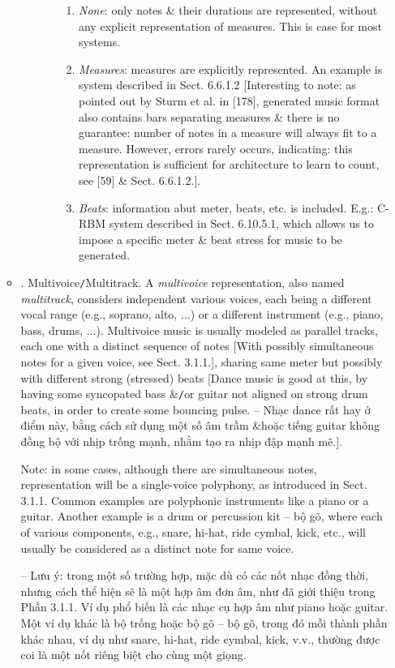 \documentclass{article}
\begin{document}
\begin{itemize}
\begin{itemize}
\begin{itemize}
\begin{itemize}
\begin{enumerate}
					\item {\it None}: only notes \& their durations are represented, without any explicit representation of measures. This is case for most systems.
					\item {\it Measures}: measures are explicitly represented. An example is system described in Sect. 6.6.1.2 [Interesting to note: as pointed out by Sturm et al. in [178], generated music format also contains bars separating measures \& there is no guarantee: number of notes in a measure will always fit to a measure. However, errors rarely occurs, indicating: this representation is sufficient for architecture to learn to count, see [59] \& Sect. 6.6.1.2.].
					\item {\it Beats}: information abut meter, beats, etc. is included. E.g.: C-RBM system described in Sect. 6.10.5.1, which allows us to impose a specific meter \& beat stress for music to be generated.
				\end{enumerate}
			\end{itemize}
		\end{itemize}
		\item {. Multivoice{\tt/}Multitrack.} A {\it multivoice} representation, also named {\it multitrack}, considers independent various voices, each being a different vocal range (e.g., soprano, alto, $\ldots$) or a different instrument (e.g., piano, bass, drums, $\ldots$). Multivoice music is usually modeled as  parallel tracks, each one with a distinct sequence of notes [With possibly simultaneous notes for a given voice, see Sect. 3.1.1.], sharing same meter but possibly with different strong (stressed) beats [Dance music is good at this, by having some syncopated bass \&{\tt/}or guitar not aligned on strong drum beats, in order to create some bouncing pulse. -- Nhạc dance rất hay ở điểm này, bằng cách sử dụng một số âm trầm \&{\tt}hoặc tiếng guitar không đồng bộ với nhịp trống mạnh, nhằm tạo ra nhịp đập mạnh mẽ.].
		
		Note: in some cases, although there are simultaneous notes, representation will be a single-voice polyphony, as introduced in Sect. 3.1.1. Common examples are polyphonic instruments like a piano or a guitar. Another example is a drum or percussion kit -- bộ gõ, where each of various components, e.g., snare, hi-hat, ride cymbal, kick, etc., will usually be considered as a distinct note for same voice.
		
		-- Lưu ý: trong một số trường hợp, mặc dù có các nốt nhạc đồng thời, nhưng cách thể hiện sẽ là một hợp âm đơn âm, như đã giới thiệu trong Phần 3.1.1. Ví dụ phổ biến là các nhạc cụ hợp âm như piano hoặc guitar. Một ví dụ khác là bộ trống hoặc bộ gõ -- bộ gõ, trong đó mỗi thành phần khác nhau, ví dụ như snare, hi-hat, ride cymbal, kick, v.v., thường được coi là một nốt riêng biệt cho cùng một giọng.
		

\end{itemize}
\end{itemize}
\end{document}
